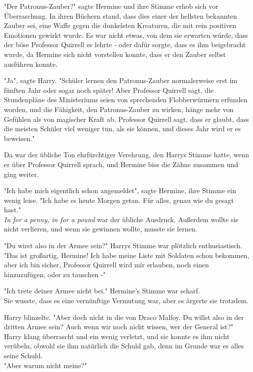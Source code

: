 {"Der Patronus-Zauber?" sagte Hermine und ihre Stimme erhob sich vor Überraschung. In ihren Büchern stand, dass dies einer der hellsten bekannten Zauber sei, eine Waffe gegen die dunkelsten Kreaturen, die mit rein positiven Emotionen gewirkt wurde. Es war nicht etwas, von dem sie erwarten würde, dass der böse Professor Quirrell es lehrte - oder dafür sorgte, dass es ihm beigebracht wurde, da Hermine sich nicht vorstellen konnte, dass er den Zauber selbst ausführen konnte.

"Ja", sagte Harry. "Schüler lernen den Patronus-Zauber normalerweise erst im fünften Jahr oder sogar noch später! Aber Professor Quirrell sagt, die Stundenpläne des Ministeriums seien von sprechenden Flobberwürmern erfunden worden, und die Fähigkeit, den Patronus-Zauber zu wirken, hänge mehr von Gefühlen als von magischer Kraft ab. Professor Quirrell sagt, dass er glaubt, dass die meisten Schüler viel weniger tun, als sie können, und dieses Jahr wird er es beweisen."

Da war der übliche Ton ehrfürchtiger Verehrung, den Harrys Stimme hatte, wenn er über Professor Quirrell sprach, und Hermine biss die Zähne zusammen und ging weiter.

"Ich habe mich eigentlich schon angemeldet", sagte Hermine, ihre Stimme ein wenig leise. "Ich habe es heute Morgen getan. Für alles, genau wie du gesagt hast."\\ \emph{In for a penny, in for a pound} war der übliche Ausdruck. Außerdem wollte sie nicht verlieren, und wenn sie gewinnen wollte, musste sie lernen.

"Du wirst also in der Armee sein?" Harrys Stimme war plötzlich enthusiastisch.\\ "Das ist großartig, Hermine! Ich habe meine Liste mit Soldaten schon bekommen, aber ich bin sicher, Professor Quirrell wird mir erlauben, noch einen hinzuzufügen, oder zu tauschen -"

"Ich trete deiner Armee nicht bei." Hermine's Stimme war scharf.\\ Sie wusste, dass es eine vernünftige Vermutung war, aber es ärgerte sie trotzdem.

Harry blinzelte. "Aber doch nicht in die von Draco Malfoy. Du willst also in der dritten Armee sein? Auch wenn wir noch nicht wissen, wer der General ist?"\\ Harry klang überrascht und ein wenig verletzt, und sie konnte es ihm nicht verübeln, obwohl sie ihm natürlich die Schuld gab, denn im Grunde war es alles seine Schuld.\\ "Aber warum nicht meine?"

}
